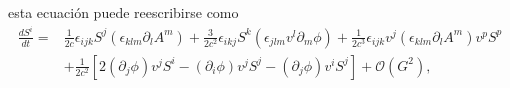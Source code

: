 %
esta ecuación puede reescribirse como 
\begin{align}
\frac{dS^i}{dt} =& \frac{1}{2c}\epsilon_{ijk}S^j\left(\epsilon_{klm}\partial_l A^m\right)+\frac{3}{2c^2}\epsilon_{ikj}S^k\left(\epsilon_{jlm}v^l\partial_m\phi\right)
+ \frac{1}{2c^3}\epsilon_{ijk}v^j(\epsilon_{klm}\partial_l A^m)v^p S^p\nonumber\\
& +\frac{1}{2c^2}\left[2(\partial_j\phi)v^jS^i-(\partial_i\phi)v^jS^j -(\partial_j\phi)v^iS^j\right]+\mathcal{O}(G^2),\label{dlidt3}
\end{align}
